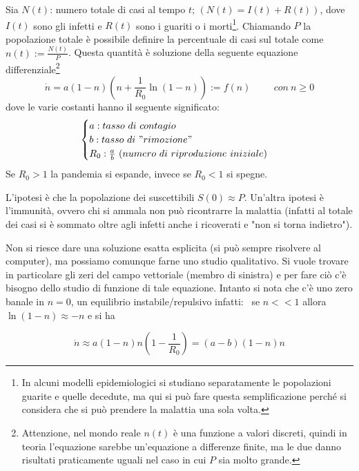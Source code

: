 \documentclass[Main.tex]{subfiles}
\begin{document}
\begin{appendic}
Sia $N(t)$: numero totale di casi al tempo $t$; $(N(t) = I(t) + R(t))$, dove $I(t)$ sono gli infetti e $R(t)$ sono i guariti o i morti\footnote{In alcuni modelli epidemiologici si studiano separatamente le popolazioni guarite e quelle decedute, ma qui si può fare questa semplificazione perché si considera che si può prendere la malattia una sola volta.}.
Chiamando $P$ la popolazione totale è possibile definire la percentuale di casi sul totale come $n(t) := \frac{N(t)}{P}$. Questa quantità è soluzione della seguente equazione differenziale\footnote{Attenzione, nel mondo reale $n(t)$ è una funzione a valori discreti, quindi in teoria l'equazione sarebbe un'equazione a differenze finite, ma le due danno risultati praticamente uguali nel caso in cui $P$ sia molto grande.}
\begin{equation}
  \dot n = a(1-n)\left(n+ \frac{1}{R_0} \ln (1-n) \right):= f(n)
 \hspace{1cm} con \ n \geqslant 0 
\end{equation}
dove le varie costanti hanno il seguente significato:
\begin{equation}
  \begin{cases}
	a: tasso \ di \ contagio \\
	b: tasso \ di \ "rimozione"\\
	R_0 : \frac{a}{b} \ (numero \ di \ riproduzione \ iniziale )\\
\end{cases}
\end{equation}
Se $R_0>1$ la pandemia si espande, invece se $R_0<1$ si spegne.

L'ipotesi è che la popolazione dei suscettibili $S(0) \approx P$. Un'altra ipotesi è l'immunità, ovvero chi si ammala non può ricontrarre la malattia (infatti al totale dei casi si è sommato oltre agli infetti anche i ricoverati e "non si torna indietro").

Non si riesce dare una soluzione esatta esplicita (si può sempre risolvere al computer), ma possiamo comunque farne uno studio qualitativo. Si vuole trovare in particolare gli zeri del campo vettoriale (membro di sinistra) e per fare ciò c'è bisogno dello studio di funzione di tale equazione. Intanto si nota che c'è uno zero banale in $n=0$, un equilibrio instabile/repulsivo infatti:
\ se $n<<1$ allora $\ln(1-n) \approx -n$ e si ha

\begin{equation}
  \dot n \approx a(1-n)n \left(1-\frac{1}{R_0} \right)=(a-b)(1-n)n
\end{equation}


\end{appendic}
\end{document}
